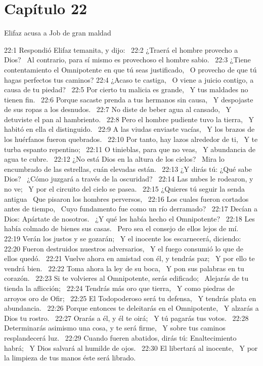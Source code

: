 \section*{Capítulo 22 }
Elifaz acusa a Job de gran maldad  

22:1 Respondió Elifaz temanita, y dijo:  
22:2 ¿Traerá el hombre provecho a Dios?  
Al contrario, para sí mismo es provechoso el hombre sabio.  
22:3 ¿Tiene contentamiento el Omnipotente en que tú seas justificado,  
O provecho de que tú hagas perfectos tus caminos? 
22:4 ¿Acaso te castiga,  
O viene a juicio contigo, a causa de tu piedad?  
22:5 Por cierto tu malicia es grande,  
Y tus maldades no tienen fin.  
22:6 Porque sacaste prenda a tus hermanos sin causa,  
Y despojaste de sus ropas a los desnudos.  
22:7 No diste de beber agua al cansado,  
Y detuviste el pan al hambriento.  
22:8 Pero el hombre pudiente tuvo la tierra,  
Y habitó en ella el distinguido.  
22:9 A las viudas enviaste vacías,  
Y los brazos de los huérfanos fueron quebrados.  
22:10 Por tanto, hay lazos alrededor de ti,  
Y te turba espanto repentino;  
22:11 O tinieblas, para que no veas,  
Y abundancia de agua te cubre.  
22:12 ¿No está Dios en la altura de los cielos?  
Mira lo encumbrado de las estrellas, cuán elevadas están.  
22:13 ¿Y dirás tú: ¿Qué sabe Dios?  
¿Cómo juzgará a través de la oscuridad?  
22:14 Las nubes le rodearon, y no ve;  
Y por el circuito del cielo se pasea.  
22:15 ¿Quieres tú seguir la senda antigua  
Que pisaron los hombres perversos,  
22:16 Los cuales fueron cortados antes de tiempo,  
Cuyo fundamento fue como un río derramado?  
22:17 Decían a Dios: Apártate de nosotros.  
¿Y qué les había hecho el Omnipotente?  
22:18 Les había colmado de bienes sus casas.  
Pero sea el consejo de ellos lejos de mí.  
22:19 Verán los justos y se gozarán;  
Y el inocente los escarnecerá, diciendo:  
22:20 Fueron destruidos nuestros adversarios,  
Y el fuego consumió lo que de ellos quedó.  
22:21 Vuelve ahora en amistad con él, y tendrás paz;  
Y por ello te vendrá bien.  
22:22 Toma ahora la ley de su boca,  
Y pon sus palabras en tu corazón.  
22:23 Si te volvieres al Omnipotente, serás edificado;  
Alejarás de tu tienda la aflicción;  
22:24 Tendrás más oro que tierra,  
Y como piedras de arroyos oro de Ofir;  
22:25 El Todopoderoso será tu defensa,  
Y tendrás plata en abundancia.  
22:26 Porque entonces te deleitarás en el Omnipotente,  
Y alzarás a Dios tu rostro.  
22:27 Orarás a él, y él te oirá;  
Y tú pagarás tus votos.  
22:28 Determinarás asimismo una cosa, y te será firme,  
Y sobre tus caminos resplandecerá luz.  
22:29 Cuando fueren abatidos, dirás tú: Enaltecimiento habrá;  
Y Dios salvará al humilde de ojos.  
22:30 El libertará al inocente,  
Y por la limpieza de tus manos éste será librado.  
